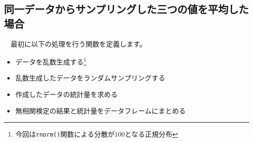 \documentclass[]{tufte-handout}
\providecommand{\tightlist}{%
  \setlength{\itemsep}{0pt}\setlength{\parskip}{0pt}}
\begin{document}
\hypertarget{ux540cux4e00ux30c7ux30fcux30bfux304bux3089ux30b5ux30f3ux30d7ux30eaux30f3ux30b0ux3057ux305fux4e09ux3064ux306eux5024ux3092ux5e73ux5747ux3057ux305fux5834ux5408}{%
\subsection{\texorpdfstring{\textbf{同一データからサンプリングした三つの値を平均した場合}}{同一データからサンプリングした三つの値を平均した場合}}\label{ux540cux4e00ux30c7ux30fcux30bfux304bux3089ux30b5ux30f3ux30d7ux30eaux30f3ux30b0ux3057ux305fux4e09ux3064ux306eux5024ux3092ux5e73ux5747ux3057ux305fux5834ux5408}}

　最初に以下の処理を行う関数を定義します。

\begin{itemize}
\tightlist
\item
  データを乱数生成する\footnote{今回は\texttt{rnorm()}関数による分散が\(100\)となる正規分布}
\item
  乱数生成したデータをランダムサンプリングする
\item
  作成したデータの統計量を求める
\item
  無相関検定の結果と統計量をデータフレームにまとめる
\end{itemize}
\end{document}
